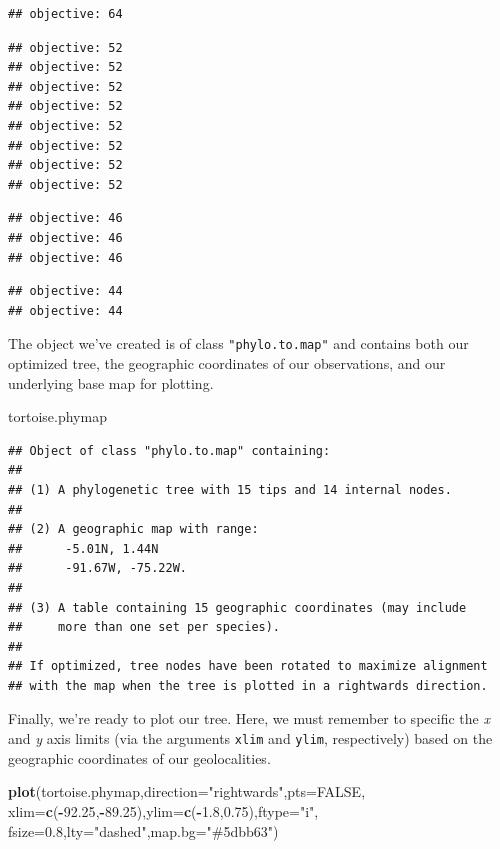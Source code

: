\documentclass[fleqn,10pt,lineno]{wlpeerj} %
\newenvironment{Shaded}{\begin{snugshade}}{\end{snugshade}}
\newcommand{\AttributeTok}[1]{\textcolor[rgb]{0.13,0.29,0.53}{#1}}
\newcommand{\ConstantTok}[1]{\textcolor[rgb]{0.56,0.35,0.01}{#1}}
\newcommand{\FloatTok}[1]{\textcolor[rgb]{0.00,0.00,0.81}{#1}}
\newcommand{\FunctionTok}[1]{\textcolor[rgb]{0.13,0.29,0.53}{\textbf{#1}}}
\newcommand{\NormalTok}[1]{#1}
\newcommand{\SpecialCharTok}[1]{\textcolor[rgb]{0.81,0.36,0.00}{\textbf{#1}}}
\newcommand{\StringTok}[1]{\textcolor[rgb]{0.31,0.60,0.02}{#1}}
\begin{document}
\begin{verbatim}
## objective: 64
\end{verbatim}

\begin{verbatim}
## objective: 52
## objective: 52
## objective: 52
## objective: 52
## objective: 52
## objective: 52
## objective: 52
## objective: 52
\end{verbatim}

\begin{verbatim}
## objective: 46
## objective: 46
## objective: 46
\end{verbatim}

\begin{verbatim}
## objective: 44
## objective: 44
\end{verbatim}

The object we've created is of class \texttt{"phylo.to.map"} and contains both our optimized tree, the geographic coordinates of our observations, and our underlying base map for plotting.

\begin{Shaded}
\begin{Highlighting}[]
\NormalTok{tortoise.phymap}
\end{Highlighting}
\end{Shaded}

\begin{verbatim}
## Object of class "phylo.to.map" containing:
## 
## (1) A phylogenetic tree with 15 tips and 14 internal nodes.
## 
## (2) A geographic map with range:
##      -5.01N, 1.44N
##      -91.67W, -75.22W.
## 
## (3) A table containing 15 geographic coordinates (may include
##     more than one set per species).
## 
## If optimized, tree nodes have been rotated to maximize alignment
## with the map when the tree is plotted in a rightwards direction.
\end{verbatim}

Finally, we're ready to plot our tree. Here, we must remember to specific the \emph{x} and \emph{y} axis limits (via the arguments \texttt{xlim} and \texttt{ylim}, respectively) based on the geographic coordinates of our geolocalities.

\begin{Shaded}
\begin{Highlighting}[]
\FunctionTok{plot}\NormalTok{(tortoise.phymap,}\AttributeTok{direction=}\StringTok{"rightwards"}\NormalTok{,}\AttributeTok{pts=}\ConstantTok{FALSE}\NormalTok{,}
  \AttributeTok{xlim=}\FunctionTok{c}\NormalTok{(}\SpecialCharTok{{-}}\FloatTok{92.25}\NormalTok{,}\SpecialCharTok{{-}}\FloatTok{89.25}\NormalTok{),}\AttributeTok{ylim=}\FunctionTok{c}\NormalTok{(}\SpecialCharTok{{-}}\FloatTok{1.8}\NormalTok{,}\FloatTok{0.75}\NormalTok{),}\AttributeTok{ftype=}\StringTok{"i"}\NormalTok{,}
  \AttributeTok{fsize=}\FloatTok{0.8}\NormalTok{,}\AttributeTok{lty=}\StringTok{"dashed"}\NormalTok{,}\AttributeTok{map.bg=}\StringTok{"\#5dbb63"}\NormalTok{)}
\end{Highlighting}
\end{Shaded}
\end{document}
